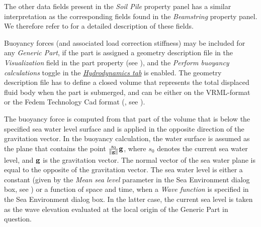 The other data fields present in the {\sl Soil Pile} property panel has a
similar interpretation as the corresponding fields found in the {\sl Beamstring}
property panel. We therefore refer to
 for a detailed
description of these fields.





Buoyancy forces (and associated load correction stiffness) may be included for
any {\sl Generic Part}, if the part is assigned a geometry description file in
the {\sl Visualization} field in the part property
(see ), and the
{\sl Perform buoyancy calculations} toggle in the
\protect\hyperlink{hydrodynamics-tab}{\sl Hydrodynamics tab} is enabled.
The geometry description file has to define a closed volume that represents the
total displaced fluid body when the part is submerged, and can be either on the
VRML-format or the Fedem Technology Cad format (,
see ).

The buoyancy force is computed from that part of the volume that is below the
specified sea water level surface and is applied in the opposite direction of
the gravitation vector. In the buoyancy calculation, the water surface is
assumed as the plane that contains the point $\frac{s_0}{\|{\bf g}\|}{\bf g}$,
where $s_0$ denotes the current sea water level,
and $\bf g$ is the gravitation vector.
The normal vector of the sea water plane is equal to the opposite of the
gravitation vector. The sea water level is either a constant
(given by the {\sl Mean sea level} parameter in the Sea Environment dialog box,
see ) or a function of space and
time, when a {\sl Wave function} is specified in the Sea Environment dialog box.
In the latter case, the current sea level is taken as the wave elevation
evaluated at the local origin of the Generic Part in question.

